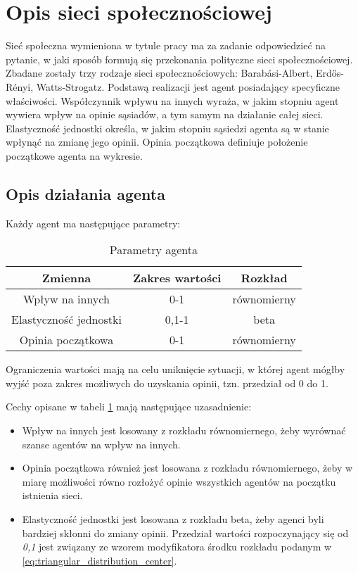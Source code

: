 \section{Opis sieci społecznościowej}
Sieć społeczna wymieniona w tytule pracy ma za zadanie odpowiedzieć na pytanie, w jaki sposób formują się przekonania polityczne sieci społecznościowej.
Zbadane zostały trzy rodzaje sieci społecznościowych: Barabási-Albert, Erdős-Rényi, Watts-Strogatz.
Podstawą realizacji jest agent posiadający specyficzne właściwości.
Współczynnik wpływu na innych wyraża, w jakim stopniu agent wywiera wpływ na opinie sąsiadów, a tym samym na działanie całej sieci.
Elastyczność jednostki określa, w jakim stopniu sąsiedzi agenta są w stanie wpłynąć na zmianę jego opinii.
Opinia początkowa definiuje położenie początkowe agenta na wykresie.

\subsection{Opis działania agenta}
Każdy agent ma następujące parametry:
\begin{table}[htbp]
    \centering
    \begin{tabular}{c|c|c}
        \hline
        Zmienna                & Zakres wartości & Rozkład     \\
        \hline
        Wpływ na innych        & 0-1             & równomierny \\
        Elastyczność jednostki & 0,1-1           & beta        \\
        Opinia początkowa      & 0-1             & równomierny \\
    \end{tabular}
    \caption{Parametry agenta}
    \label{tab:agent_parameters}
\end{table}

Ograniczenia wartości mają na celu uniknięcie sytuacji, w której agent mógłby wyjść poza zakres możliwych do uzyskania opinii, tzn. przedział od 0 do 1.

Cechy opisane w tabeli \ref{tab:agent_parameters} mają następujące uzasadnienie:
\begin{itemize}
    \item Wpływ na innych jest losowany z rozkładu równomiernego, żeby wyrównać szanse agentów na wpływ na innych.
    \item Opinia początkowa również jest losowana z rozkładu równomiernego, żeby w miarę możliwości równo rozłożyć opinie wszystkich agentów na początku istnienia sieci.
    \item Elastyczność jednostki jest losowana z rozkładu beta, żeby agenci byli bardziej skłonni do zmiany opinii.
          Przedział wartości rozpoczynający się od \textit{0,1} jest związany ze wzorem modyfikatora środku rozkładu podanym w \ref{eq:triangular_distribution_center}.
\end{itemize}